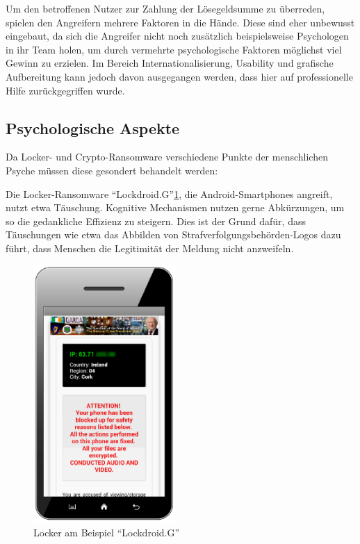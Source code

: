 Um den betroffenen Nutzer zur Zahlung der Lösegeldsumme zu überreden, spielen den Angreifern mehrere Faktoren in die Hände. Diese sind eher unbewusst eingebaut, da sich die Angreifer nicht noch zusätzlich beispielsweise Psychologen in ihr Team holen, um durch vermehrte psychologische Faktoren möglichst viel Gewinn zu erzielen. Im Bereich Internationalisierung\cite{faktoren:l18n}, Usability und grafische Aufbereitung\cite{faktoren:grafik}\cite{evolution} kann jedoch davon ausgegangen werden, dass hier auf professionelle Hilfe zurückgegriffen wurde.

\subsection{Psychologische Aspekte}

Da Locker- und Crypto-Ransomware verschiedene Punkte der menschlichen Psyche müssen diese gesondert behandelt werden:

Die Locker-Ransomware ``Lockdroid.G''\ref{fig:lockdroid}, die Android-Smartphones angreift, nutzt etwa Täuschung. Kognitive Mechanismen nutzen gerne Abkürzungen, um so die gedankliche Effizienz zu steigern. Dies ist der Grund dafür, dass Täuschungen wie etwa das Abbilden von Strafverfolgungsbehörden-Logos dazu führt, dass Menschen die Legitimität der Meldung nicht anzweifeln. 

\begin{figure}
  \begin{center}
    \includegraphics[width=0.48\textwidth]{img/android_locker.png}
  \end{center}
  \caption{Locker am Beispiel ``Lockdroid.G''\cite{evolution}}
  \label{fig:lockdroid}
\end{figure}

